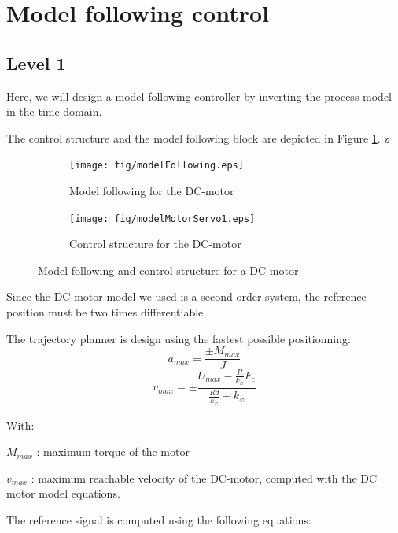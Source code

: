 \section*{Model following control}

\subsection*{Level 1}

Here, we will design a model following controller by inverting the process model in the time domain.

The control structure and the model following block are depicted in Figure \ref{contStruct}.
z
\begin{figure}[t!p]
\begin{center}
  \begin{subfigure}[b]{\columnwidth}
  \texttt{[image: fig/modelFollowing.eps]}
 \caption{Model following for the DC-motor}
  \end{subfigure}
    \begin{subfigure}[b]{\columnwidth}
  \texttt{[image: fig/modelMotorServo1.eps]}
   \caption{Control structure for the DC-motor}
  \end{subfigure}
  \caption{Model following and control structure for a DC-motor}
 \label{contStruct}
\end{center}
\end{figure}

Since the DC-motor model we used is a second order system, the reference position must be two times differentiable. 

The trajectory planner is design using the fastest possible positionning:
\begin{equation}a_{max} = \frac{\pm M_{max}}{J}\end{equation}
\begin{equation}v_{max} = \pm \frac{U_{max} - \frac{R}{k_\varphi} F_c}{\frac{R d}{k_\varphi} + k_\varphi}\end{equation}

With:

$M_{max}$ : maximum torque of the motor

$v_{max}$ : maximum reachable velocity of the DC-motor, computed with the DC motor model equations.

The reference signal is computed using the following equations:

